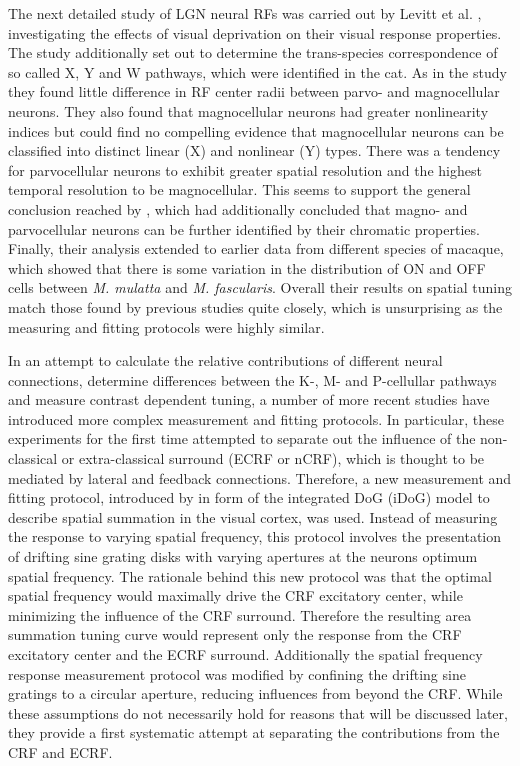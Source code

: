 The next detailed study of LGN neural RFs was carried out by Levitt et
al. \cite{Levitt2001}, investigating the effects of visual deprivation
on their visual response properties. The study additionally set out to
determine the trans-species correspondence of so called X, Y and W
pathways, which were identified in the cat. As in the \cite{Spear1994}
study they found little difference in RF center radii between parvo-
and magnocellular neurons. They also found that magnocellular neurons
had greater nonlinearity indices but could find no compelling evidence
that magnocellular neurons can be classified into distinct linear (X)
and nonlinear (Y) types. There was a tendency for parvocellular
neurons to exhibit greater spatial resolution and the highest temporal
resolution to be magnocellular. This seems to support the general
conclusion reached by \cite{Derrington1984}, which had additionally
concluded that magno- and parvocellular neurons can be further
identified by their chromatic properties.  Finally, their analysis
extended to earlier data from different species of macaque, which
showed that there is some variation in the distribution of ON and OFF
cells between \emph{M. mulatta} and \emph{M. fascularis}. Overall
their results on spatial tuning match those found by previous studies
quite closely, which is unsurprising as the measuring and fitting
protocols were highly similar.

In an attempt to calculate the relative contributions of different
neural connections, determine differences between the K-, M- and
P-cellullar pathways and measure contrast dependent tuning, a number
of more recent studies have introduced more complex measurement and
fitting protocols. In particular, these experiments for the first time
attempted to separate out the influence of the non-classical or
extra-classical surround (ECRF or nCRF), which is thought to be
mediated by lateral and feedback connections. Therefore, a new
measurement and fitting protocol, introduced by \cite{Sceniak1999} in
form of the integrated DoG (iDoG) model to describe spatial summation
in the visual cortex, was used. Instead of measuring the response to
varying spatial frequency, this protocol involves the presentation of
drifting sine grating disks with varying apertures at the neurons
optimum spatial frequency. The rationale behind this new protocol was
that the optimal spatial frequency would maximally drive the CRF
excitatory center, while minimizing the influence of the CRF
surround. Therefore the resulting area summation tuning curve would
represent only the response from the CRF excitatory center and the
ECRF surround. Additionally the spatial frequency response measurement
protocol was modified by confining the drifting sine gratings to a
circular aperture, reducing influences from beyond the CRF. While
these assumptions do not necessarily hold for reasons that will be
discussed later, they provide a first systematic attempt at separating
the contributions from the CRF and ECRF.


